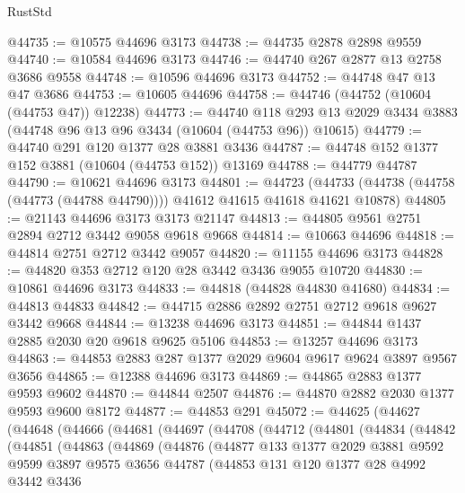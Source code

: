 \begin{lexlean}{RustStd}
\begin{coremodule}
@44735 := @10575 @44696 @3173
@44738 := @44735 @2878 @2898 @9559
@44740 := @10584 @44696 @3173
@44746 := @44740 @267 @2877 @13 @2758 @3686 @9558
@44748 := @10596 @44696 @3173
@44752 := @44748 @47 @13 @47 @3686
@44753 := @10605 @44696
@44758 := @44746 (@44752 (@10604 (@44753 @47)) @12238)
@44773 := @44740
    @118
    @293
    @13
    @2029
    @3434
    @3883
    (@44748 @96 @13 @96 @3434 (@10604 (@44753 @96)) @10615)
@44779 := @44740 @291 @120 @1377 @28 @3881 @3436
@44787 := @44748 @152 @1377 @152 @3881 (@10604 (@44753 @152)) @13169
@44788 := @44779 @44787
@44790 := @10621 @44696 @3173
@44801 := @44723
    (@44733 (@44738 (@44758 (@44773 (@44788 @44790)))) @41612 @41615 @41618 @41621 @10878)
@44805 := @21143 @44696 @3173 @3173 @21147
@44813 := @44805 @9561 @2751 @2894 @2712 @3442 @9058 @9618 @9668
@44814 := @10663 @44696
@44818 := @44814 @2751 @2712 @3442 @9057
@44820 := @11155 @44696 @3173
@44828 := @44820 @353 @2712 @120 @28 @3442 @3436 @9055 @10720
@44830 := @10861 @44696 @3173
@44833 := @44818 (@44828 @44830 @41680)
@44834 := @44813 @44833
@44842 := @44715 @2886 @2892 @2751 @2712 @9618 @9627 @3442 @9668
@44844 := @13238 @44696 @3173
@44851 := @44844 @1437 @2885 @2030 @20 @9618 @9625 @5106
@44853 := @13257 @44696 @3173
@44863 := @44853 @2883 @287 @1377 @2029 @9604 @9617 @9624 @3897 @9567 @3656
@44865 := @12388 @44696 @3173
@44869 := @44865 @2883 @1377 @9593 @9602
@44870 := @44844 @2507
@44876 := @44870 @2882 @2030 @1377 @9593 @9600 @8172
@44877 := @44853 @291
@45072 := @44625
    (@44627
      (@44648
        (@44666
          (@44681
            (@44697
              (@44708
                (@44712
                  (@44801
                    (@44834
                      (@44842
                        (@44851
                          (@44863
                            (@44869
                              (@44876
                                (@44877
                                  @133
                                  @1377
                                  @2029
                                  @3881
                                  @9592
                                  @9599
                                  @3897
                                  @9575
                                  @3656
                                  @44787
                                  (@44853
                                    @131
                                    @120
                                    @1377
                                    @28
                                    @4992
                                    @3442
                                    @3436

\end{coremodule}
\end{lexlean}
